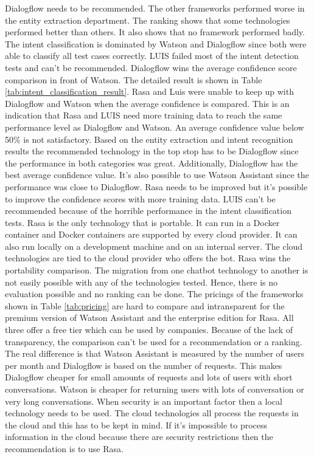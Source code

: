 Dialogflow needs to be recommended.
The other frameworks performed worse in the entity extraction 
department.
The ranking shows that some technologies performed better than others.
It also shows that no framework performed badly.
The intent classification is dominated by Watson and Dialogflow since 
both were able to classify all test cases correctly.
LUIS failed most of the intent detection tests and can't be recommended.
Dialogflow wins the average confidence score comparison in front of Watson.
The detailed result is shown in Table \ref{tab:intent_classification_result}.
Rasa and Luis were unable to keep up with Dialogflow and Watson when the 
average confidence is compared.
This is an indication that Rasa and LUIS need more training data to 
reach the same performance level as Dialogflow and Watson.
An average confidence value below 50\% is not satisfactory.
Based on the entity extraction and intent recognition results
the recommended technology in the top stop has to be Dialogflow
since the performance in both categories was great.
Additionally, Dialogflow has the best average confidence value.
It's also possible to use Watson Assistant since the performance was close to Dialogflow.
Rasa needs to be improved but it's possible to improve the confidence scores with more training data.
LUIS can't be recommended because of the horrible performance in the intent classification tests.
Rasa is the only technology that is portable.
It can run in a Docker container and Docker containers are supported by every 
cloud provider.
It can also run locally on a development machine and on an internal server.
The cloud technologies are tied to the cloud provider who offers the bot.
Rasa wins the portability comparison.
The migration from one chatbot technology to another is not easily possible with 
any of the technologies tested. 
Hence, there is no evaluation possible and no ranking can be done.
The pricings of the frameworks shown in Table \ref{tab:pricing} are hard to compare and intransparent for the premium version of Watson Assistant and the enterprise edition for Rasa.
All three offer a free tier which can be used by companies.
Because of the lack of transparency, the comparison can't be used for a recommendation or a ranking.
The real difference is that Watson Assistant is measured by the number of users per month and 
Dialogflow is based on the number of requests.
This makes Dialogflow cheaper for small amounts of requests and lots of users with short conversations.
Watson is cheaper for returning users with lots of conversation or very long conversations.
When security is an important factor then a local technology needs to be used.
The cloud technologies all process the requests in the cloud and this has to be 
kept in mind.
If it's impossible to process information in the cloud because there are security restrictions
then the recommendation is to use Rasa.

